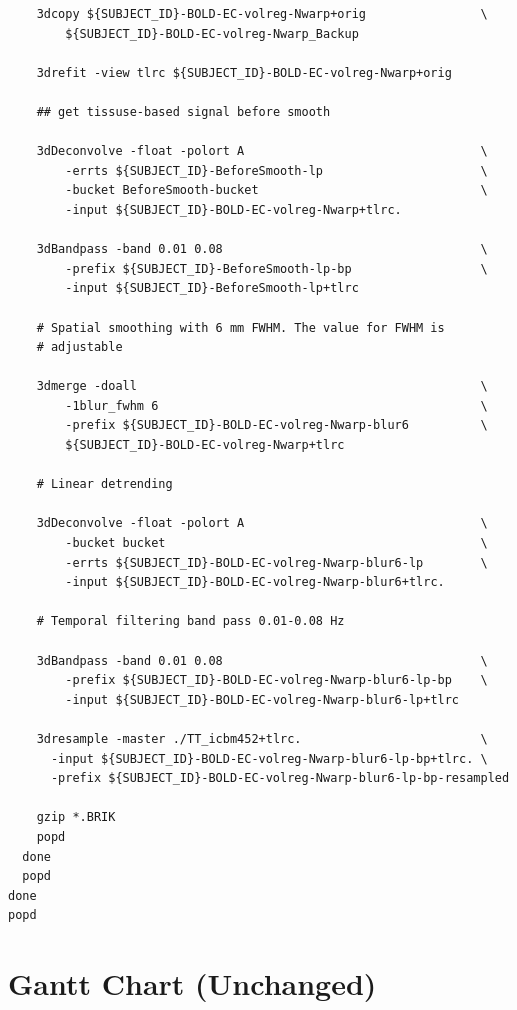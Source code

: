 \documentclass[12pt]{article}
\begin{document}
\begin{verbatim}
    3dcopy ${SUBJECT_ID}-BOLD-EC-volreg-Nwarp+orig                \
        ${SUBJECT_ID}-BOLD-EC-volreg-Nwarp_Backup

    3drefit -view tlrc ${SUBJECT_ID}-BOLD-EC-volreg-Nwarp+orig

    ## get tissuse-based signal before smooth

    3dDeconvolve -float -polort A                                 \
        -errts ${SUBJECT_ID}-BeforeSmooth-lp                      \
        -bucket BeforeSmooth-bucket                               \
        -input ${SUBJECT_ID}-BOLD-EC-volreg-Nwarp+tlrc.

    3dBandpass -band 0.01 0.08                                    \
        -prefix ${SUBJECT_ID}-BeforeSmooth-lp-bp                  \
        -input ${SUBJECT_ID}-BeforeSmooth-lp+tlrc

    # Spatial smoothing with 6 mm FWHM. The value for FWHM is
    # adjustable

    3dmerge -doall                                                \
        -1blur_fwhm 6                                             \
        -prefix ${SUBJECT_ID}-BOLD-EC-volreg-Nwarp-blur6          \
        ${SUBJECT_ID}-BOLD-EC-volreg-Nwarp+tlrc

    # Linear detrending

    3dDeconvolve -float -polort A                                 \
        -bucket bucket                                            \
        -errts ${SUBJECT_ID}-BOLD-EC-volreg-Nwarp-blur6-lp        \
        -input ${SUBJECT_ID}-BOLD-EC-volreg-Nwarp-blur6+tlrc.

    # Temporal filtering band pass 0.01-0.08 Hz

    3dBandpass -band 0.01 0.08                                    \
        -prefix ${SUBJECT_ID}-BOLD-EC-volreg-Nwarp-blur6-lp-bp    \
        -input ${SUBJECT_ID}-BOLD-EC-volreg-Nwarp-blur6-lp+tlrc

    3dresample -master ./TT_icbm452+tlrc.                         \
      -input ${SUBJECT_ID}-BOLD-EC-volreg-Nwarp-blur6-lp-bp+tlrc. \
      -prefix ${SUBJECT_ID}-BOLD-EC-volreg-Nwarp-blur6-lp-bp-resampled

    gzip *.BRIK
    popd
  done
  popd
done
popd

\end{verbatim}

\endgroup


\section{Gantt Chart (Unchanged)}%
\label{sec:gantt_chart_unchanged_}
\end{document}
